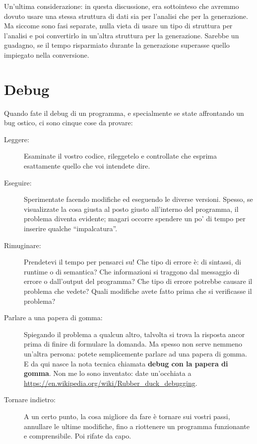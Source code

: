 \documentclass[10pt]{book}
\begin{document}
Un'ultima considerazione: in questa discussione, era sottointeso che avremmo dovuto usare una stessa struttura di dati sia per l'analisi che per la generazione. Ma siccome sono fasi separate, nulla vieta di usare un tipo di struttura per l'analisi e poi convertirlo in un'altra struttura per la generazione. Sarebbe un guadagno, se il tempo risparmiato durante la generazione superasse quello impiegato nella conversione.


\section{Debug}

Quando fate il debug di un programma, e specialmente se state affrontando un bug ostico, ci sono cinque cose da provare:

\begin{description}

\item[Leggere:] Esaminate il vostro codice, rileggetelo e controllate che esprima esattamente quello che voi intendete dire.

\item[Eseguire:] Sperimentate facendo modifiche ed eseguendo le diverse versioni. Spesso, se visualizzate la cosa giusta al posto giusto all'interno del programma, il problema diventa evidente; magari occorre spendere un po' di tempo per inserire qualche ``impalcatura''.

\item[Rimuginare:] Prendetevi il tempo per pensarci su! Che tipo di errore è: di sintassi, di runtime o di semantica? Che informazioni si traggono dal messaggio di errore o dall'output del programma? Che tipo di errore potrebbe causare il problema che vedete? Quali modifiche avete fatto prima che si verificasse il problema?

\item[Parlare a una papera di gomma:] Spiegando il problema a qualcun altro, talvolta si trova la risposta ancor prima di finire di formulare la domanda. Ma spesso non serve nemmeno un'altra persona: potete semplicemente parlare ad una papera di gomma. E da qui nasce la nota tecnica chiamata {\bf debug con la papera di gomma}.  Non me lo sono inventato: date un'occhiata a 
  \url{https://en.wikipedia.org/wiki/Rubber_duck_debugging}.
  
\item[Tornare indietro:] A un certo punto, la cosa migliore da fare è tornare sui vostri passi, annullare le ultime modifiche, fino a riottenere un programma funzionante e comprensibile. Poi rifate da capo.

\end{description}
\end{document}
